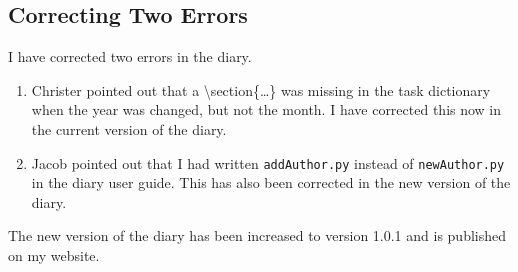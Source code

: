 \subsection{Correcting Two Errors}
\label{task:20140929_jkn0}
I have corrected two errors in the diary.
\begin{enumerate}
    \item Christer pointed out that a {\textbackslash section\{\ldots\}} was missing in the task dictionary when the year was changed, but not the month. I have corrected this now in the current version of the diary.
    \item Jacob pointed out that I had written {\tt addAuthor.py} instead of {\tt newAuthor.py} in the diary user guide. This has also been corrected in the new version of the diary. 
\end{enumerate}
The new version of the diary has been increased to version 1.0.1 and is published on my website.

